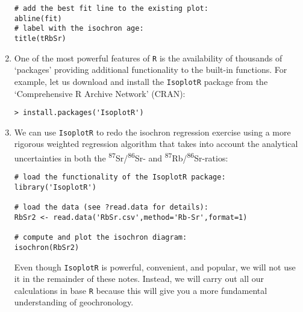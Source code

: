 \begin{enumerate}
\begin{verbatim}
# add the best fit line to the existing plot:
abline(fit)
# label with the isochron age: 
title(tRbSr)
\end{verbatim}

\item\label{it:installingIsoplotR} One of the most powerful features
  of \texttt{R} is the availability of thousands of `packages'
  providing additional functionality to the built-in functions.  For
  example, let us download and install the \texttt{IsoplotR} package
  from the `Comprehensive R Archive Network' (CRAN):

\begin{verbatim}
> install.packages('IsoplotR')
\end{verbatim}

\item We can use \texttt{IsoplotR} to redo the isochron regression
  exercise using a more rigorous weighted regression algorithm that
  takes into account the analytical uncertainties in both the
  \textsuperscript{87}Sr/\textsuperscript{86}Sr- and
  \textsuperscript{87}Rb/\textsuperscript{86}Sr-ratios:

\begin{verbatim}
# load the functionality of the IsoplotR package:
library('IsoplotR')

# load the data (see ?read.data for details):
RbSr2 <- read.data('RbSr.csv',method='Rb-Sr',format=1)

# compute and plot the isochron diagram:
isochron(RbSr2)
\end{verbatim}

Even though \texttt{IsoplotR} is powerful, convenient, and popular, we
will not use it in the remainder of these notes. Instead, we will
carry out all our calculations in base \texttt{R} because this will
give you a more fundamental understanding of geochronology.
\end{enumerate}
